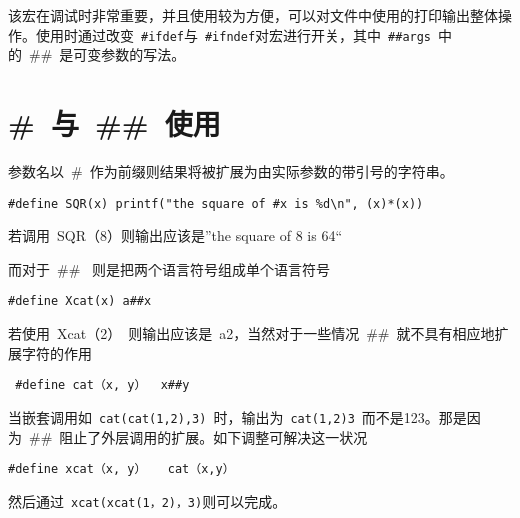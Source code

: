该宏在调试时非常重要，并且使用较为方便，可以对文件中使用的打印输出整体操作。使用时通过改变~\verb|#ifdef|与~\verb|#ifndef|对宏进行开关，其中~\verb|##args|~中的~\#\#~是可变参数的写法。

\section{\#~与~\#\#~使用}
\label{sec:cat}
参数名以~\#~作为前缀则结果将被扩展为由实际参数的带引号的字符串。
\begin{verbatim}
#define SQR(x) printf("the square of #x is %d\n", (x)*(x))
\end{verbatim}
若调用~SQR（8）则输出应该是”the square of 8 is 64“

而对于~\#\#~ 则是把两个语言符号组成单个语言符号
\begin{verbatim}
#define Xcat(x) a##x
\end{verbatim} 
若使用~Xcat（2）~则输出应该是~a2，当然对于一些情况~\#\#~就不具有相应地扩展字符的作用
\begin{verbatim}
 #define cat（x, y）  x##y
\end{verbatim}
当嵌套调用如~\verb|cat(cat(1,2),3)|~时，输出为~\verb|cat(1,2)3|~而不是123。那是因为~\#\#~阻止了外层调用的扩展。如下调整可解决这一状况
\begin{verbatim}
#define xcat（x, y）   cat（x,y）
\end{verbatim}
然后通过~\verb|xcat(xcat(1，2)，3)|则可以完成。

